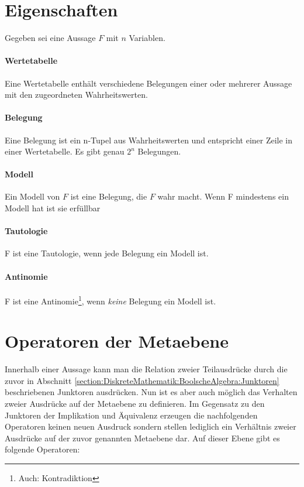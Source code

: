 \documentclass[../main.tex]{subfiles}
\begin{document}
                
    \section{Eigenschaften}
        Gegeben sei eine Aussage $F$ mit $n$ Variablen.
        
        \paragraph{Wertetabelle}
            Eine Wertetabelle enthält verschiedene Belegungen einer oder mehrerer Aussage mit den zugeordneten Wahrheitswerten.
            
        \paragraph{Belegung}
			Eine Belegung ist ein n-Tupel aus Wahrheitswerten und entspricht einer Zeile in einer Wertetabelle. Es gibt genau $2^n$ Belegungen.
            
        
        \paragraph{Modell}
            Ein Modell von $F$ ist eine Belegung, die $F$ wahr macht. Wenn F mindestens ein Modell hat ist sie erfüllbar
            
        \paragraph{Tautologie}
            F ist eine Tautologie, wenn jede Belegung ein Modell ist.
            
        \paragraph{Antinomie}
            F ist eine Antinomie\footnote{Auch: Kontradiktion}, wenn \emph{keine} Belegung ein Modell ist.
                
    \section[Metaebene]{Operatoren der Metaebene}
        Innerhalb einer Aussage kann man die Relation zweier Teilausdrücke durch die zuvor in Abschnitt \ref{section:DiskreteMathematik:BoolscheAlgebra:Junktoren} beschriebenen Junktoren ausdrücken. Nun ist es aber auch möglich das Verhalten zweier Ausdrücke auf der Metaebene zu definieren. Im Gegensatz zu den Junktoren der Implikation und Äquivalenz erzeugen die nachfolgenden Operatoren keinen neuen Ausdruck sondern stellen lediglich ein Verhältnis zweier Ausdrücke auf der zuvor genannten Metaebene dar. Auf dieser Ebene gibt es folgende Operatoren:
        
\end{document}
